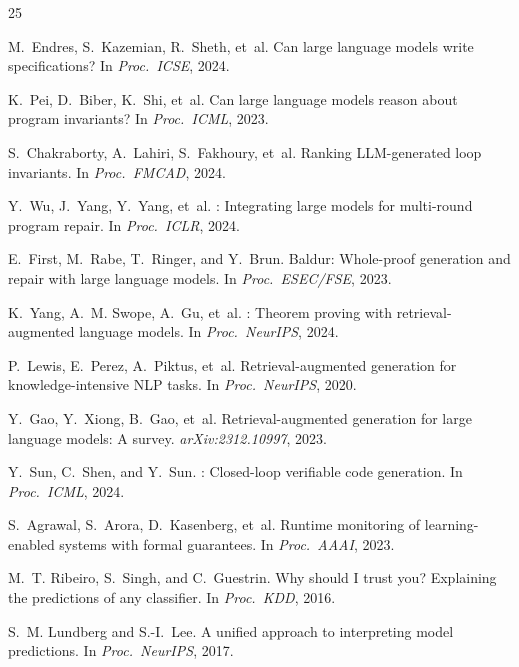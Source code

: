 \documentclass[11pt]{article}
\begin{document}
\begin{thebibliography}{25}

M.~Endres, S.~Kazemian, R.~Sheth, et~al.
\newblock Can large language models write specifications?
\newblock In \emph{Proc.\ ICSE}, 2024.

K.~Pei, D.~Biber, K.~Shi, et~al.
\newblock Can large language models reason about program invariants?
\newblock In \emph{Proc.\ ICML}, 2023.

S.~Chakraborty, A.~Lahiri, S.~Fakhoury, et~al.
\newblock Ranking {LLM}-generated loop invariants.
\newblock In \emph{Proc.\ FMCAD}, 2024.

Y.~Wu, J.~Yang, Y.~Yang, et~al.
: Integrating large models for multi-round
  program repair.
\newblock In \emph{Proc.\ ICLR}, 2024.

E.~First, M.~Rabe, T.~Ringer, and Y.~Brun.
\newblock Baldur: Whole-proof generation and repair with
  large language models.
\newblock In \emph{Proc.\ ESEC/FSE}, 2023.

K.~Yang, A.~M. Swope, A.~Gu, et~al.
: Theorem proving with retrieval-augmented
  language models.
\newblock In \emph{Proc.\ NeurIPS}, 2024.

P.~Lewis, E.~Perez, A.~Piktus, et~al.
\newblock Retrieval-augmented generation for knowledge-intensive
  {NLP} tasks.
\newblock In \emph{Proc.\ NeurIPS}, 2020.

Y.~Gao, Y.~Xiong, B.~Gao, et~al.
\newblock Retrieval-augmented generation for large language
  models: A survey.
\newblock \emph{arXiv:2312.10997}, 2023.

Y.~Sun, C.~Shen, and Y.~Sun.
: Closed-loop verifiable code generation.
\newblock In \emph{Proc.\ ICML}, 2024.

S.~Agrawal, S.~Arora, D.~Kasenberg, et~al.
\newblock Runtime monitoring of learning-enabled systems with
  formal guarantees.
\newblock In \emph{Proc.\ AAAI}, 2023.

M.~T. Ribeiro, S.~Singh, and C.~Guestrin.
\newblock Why should {I} trust you? Explaining the predictions
  of any classifier.
\newblock In \emph{Proc.\ KDD}, 2016.

S.~M. Lundberg and S.-I.~Lee.
\newblock A unified approach to interpreting model predictions.
\newblock In \emph{Proc.\ NeurIPS}, 2017.


\end{thebibliography}
\end{document}
